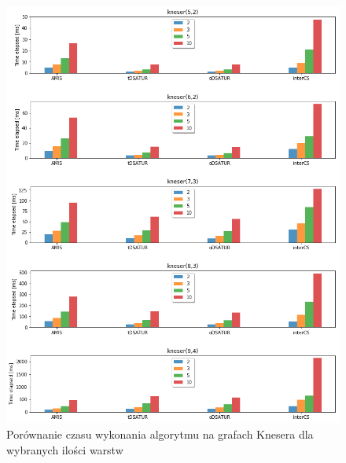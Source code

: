 \documentclass[10pt,a4paper]{article}
\begin{document}
	\vspace*{\fill}
	\begin{figure}[H]
		\begin{center}
			\includegraphics[width=\textwidth]{images/tests/kneser_graphs/performance_per_folds.png}
			\caption{Porównanie czasu wykonania algorytmu na grafach Knesera dla wybranych ilości warstw}
		\end{center}
	\end{figure}
	\vspace*{\fill}
	
	\pagebreak
\end{document}
